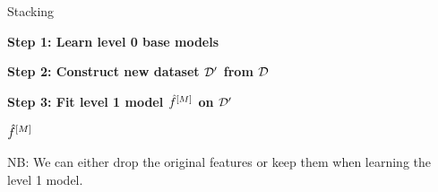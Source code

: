 \documentclass[10pt,compress,t,notes=noshow, xcolor=table]{beamer}
\begin{document}

\begin{vbframe}{Stacking}
\footnotesize
\begin{algorithm}[H]
    \SetAlgoLined
    \caption{Single Layer Stacking}

    
    \BlankLine
    \textbf{Step 1: Learn level 0 base models}\;\\
    
    \BlankLine
    \textbf{Step 2: Construct new dataset $\mathcal{D}^\prime$ from $\mathcal{D}$}\;\\
    
    \BlankLine
    \textbf{Step 3: Fit level 1 model $\hat{f}^{[M]}$ on $\mathcal{D}^\prime$}\;
    
    \KwRet $\hat{f}^{[M]}$\;
\end{algorithm}
NB: We can either drop the original features or keep them when learning the level 1 model.

\end{vbframe}

\end{document}
